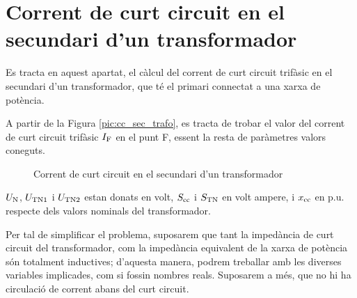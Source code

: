 \section{Corrent de curt circuit en el  secundari d'un transformador}

 Es tracta en aquest apartat, el c\`{a}lcul del corrent de curt
circuit trif\`{a}sic en el secundari d'un transformador, que t\'{e} el
primari connectat  a una xarxa de pot\`{e}ncia.

A partir de la Figura \vref{pic:cc_sec_trafo}, es tracta de trobar
el valor del corrent de curt circuit trif\`{a}sic $I_\mathrm{F}$ en el punt
F, essent la resta de par\`{a}metres valors coneguts.

\begin{figure}[htb]
\vspace{3mm} \centering {} \caption{Corrent de curt circuit en el  secundari d'un
transformador} \label{pic:cc_sec_trafo}
\end{figure}

$U_\mathrm{N}$, $U_\mathrm{TN1}$ i $U_\mathrm{TN2}$ estan donats en volt,
$S_\mathrm{cc}$ i $S_\mathrm{TN}$ en volt ampere, i $x_\mathrm{cc}$ en p.u.
respecte dels valors nominals del transformador.


Per tal de simplificar el problema, suposarem que tant la imped\`{a}ncia
de curt circuit del transformador, com la imped\`{a}ncia equivalent de
la xarxa de pot\`{e}ncia s\'{o}n totalment inductives; d'aquesta manera,
podrem treballar amb les diverses variables implicades, com si
fossin nombres reals. Suposarem a m\'{e}s, que no hi ha circulaci\'{o} de
corrent abans del curt circuit.

